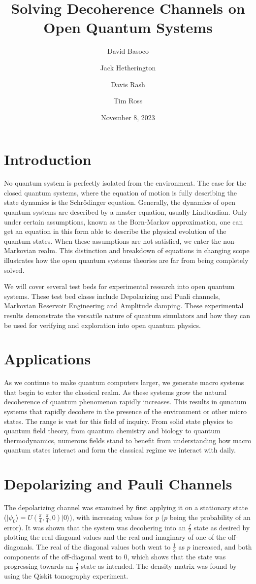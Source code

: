 \documentclass[12pt]{article}
\title{Solving Decoherence Channels on Open Quantum Systems}
\author{David Basoco \and Jack Hetherington \and Davis Rash \and Tim Ross}
\date{November 8, 2023}
\begin{document}
  \maketitle

  \section{Introduction}
  No quantum system is perfectly isolated from the environment. The case for the closed quantum systems, where the equation of motion is fully describing the state dynamics is the Schr\"{o}dinger equation. Generally, the dynamics of open quantum systems are described by a master equation, usually Lindbladian. Only under certain assumptions, known as the Born-Markov approximation, one can get an equation in this form able to describe the physical evolution of the quantum states. When these assumptions are not satisfied, we enter the non-Markovian realm. This distinction and breakdown of equations in changing scope illustrates how the open quantum systems theories are far from being completely solved.  

  We will cover several test beds for experimental research into open quantum systems. These test bed classs include Depolarizing and Puali channels, Markovian Reservoir Engineering and Amplitude damping. These experimental results demonstrate the versatile nature of quantum simulators and how they can be used for verifying and exploration into open quantum physics. 
  \blindtext

  \section{Applications}
  As we continue to make quantum computers larger, we generate macro systems that begin to enter the classical realm. As these systems grow the natural decoherence of quantum phenomenon rapidly increases. This results in qunatum systems that rapidly decohere in the presence of the environment or other micro states. The range is vast for this field of inquiry. From solid state physics to quantum field theory, from quantum chemistry and biology to quantum thermodynamics, numerous fields stand to benefit from understanding how macro quantum states interact and form the classical regime we interact with daily.
  \blindtext

  \section{Depolarizing and Pauli Channels}
  The depolarizing channel was examined by first applying it on a stationary state ($\vert\psi_0\rangle = U(\frac{\pi}{4}, \frac{\pi}{4},0)\vert 0\rangle$), with increasing values for $p$ ($p$ being the probability of an error). It was shown that the system was decohering into an $\frac{I}{2}$ state as desired by plotting the real diagonal values and the real and imaginary of one of the off-diagonals. The real of the diagonal values both went to $\frac{1}{2}$ as $p$ increased, and both components of the off-diagonal went to 0, which shows that the state was progressing towards an $\frac{I}{2}$ state as intended. The density matrix was found by using the Qiskit tomography experiment. 
\end{document}
